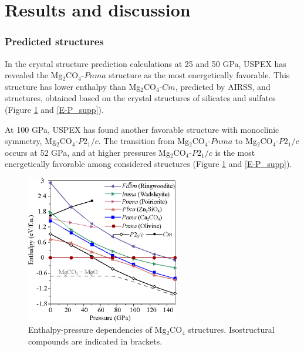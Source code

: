 \documentclass[a4paperm]{article}
\begin{document}
			\section*{Results and discussion}
 
\subsubsection*{Predicted structures}
In the crystal structure prediction calculations at 25 and 50 GPa, USPEX has revealed the Mg$_2$CO$_4$-$Pnma$ structure as the most energetically favorable.
This structure has lower enthalpy than Mg$_2$CO$_4$-$Cm$, predicted by AIRSS, and structures, obtained based on the crystal structures of silicates and sulfates (Figure \ref{E-P} and \ref{E-P_supp}).

At 100 GPa, USPEX has found another favorable structure with monoclinic symmetry, Mg$_2$CO$_4$-$P2_1/c$.
The transition from Mg$_2$CO$_4$-$Pnma$ to Mg$_2$CO$_4$-$P2_1/c$ occurs at 52 GPa, and at higher pressures Mg$_2$CO$_4$-$P2_1/c$ is the most energetically favorable among considered structures (Figure \ref{E-P} and \ref{E-P_supp}). 

\begin{figure}[H]
	\includegraphics[width=0.6\textwidth]{E-P_mg2co4} \centering
	\caption{Enthalpy-pressure dependencies of Mg$_2$CO$_4$ structures. Isostructural compounds are indicated in brackets.
} \label{E-P}
\end{figure} 
\end{document}
